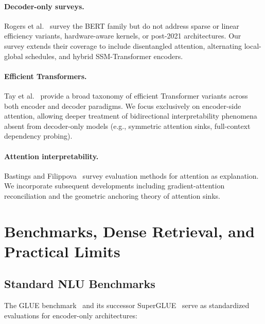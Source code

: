 \documentclass[11pt]{article}
\begin{document}
\paragraph{Decoder-only surveys.} Rogers et al.~\cite{rogers2020primer} survey the BERT family but do not address sparse or linear efficiency variants, hardware-aware kernels, or post-2021 architectures. Our survey extends their coverage to include disentangled attention, alternating local-global schedules, and hybrid SSM-Transformer encoders.

\paragraph{Efficient Transformers.} Tay et al.~\cite{tay2022efficient} provide a broad taxonomy of efficient Transformer variants across both encoder and decoder paradigms. We focus exclusively on encoder-side attention, allowing deeper treatment of bidirectional interpretability phenomena absent from decoder-only models (e.g., symmetric attention sinks, full-context dependency probing).

\paragraph{Attention interpretability.} Bastings and Filippova~\cite{bastings2020elephant} survey evaluation methods for attention as explanation. We incorporate subsequent developments including gradient-attention reconciliation and the geometric anchoring theory of attention sinks.

\section{Benchmarks, Dense Retrieval, and Practical Limits}

\subsection{Standard NLU Benchmarks}

The GLUE benchmark~\cite{wang2018glue} and its successor SuperGLUE~\cite{wang2019superglue} serve as standardized evaluations for encoder-only architectures:
\end{document}
